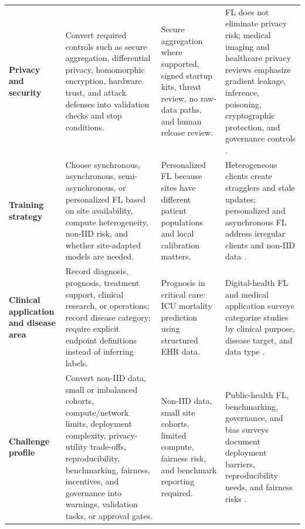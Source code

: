 \documentclass[preprint,5p, 10pt, times]{elsarticle}
\begin{document}
\begin{table}[t]
\begin{tabularx}{\textwidth}{
>{\raggedright\arraybackslash}p{2.6cm}
>{\raggedright\arraybackslash}X
>{\raggedright\arraybackslash}X
>{\raggedright\arraybackslash}X}
\textbf{Privacy and security}
& Convert required controls such as secure aggregation, differential privacy, homomorphic encryption, hardware trust, and attack defenses into validation checks and stop conditions.
& Secure aggregation where supported, signed startup kits, threat review, no raw-data paths, and human release review.
& FL does not eliminate privacy risk; medical imaging and healthcare privacy reviews emphasize gradient leakage, inference, poisoning, cryptographic protection, and governance controls \cite{kaissis2020secure,who2021ethicsaihealth,nist2023airmf}. \\

\textbf{Training strategy}
& Choose synchronous, asynchronous, semi-asynchronous, or personalized FL based on site availability, compute heterogeneity, non-IID risk, and whether site-adapted models are needed.
& Personalized FL because sites have different patient populations and local calibration matters.
& Heterogeneous clients create stragglers and stale updates; personalized and asynchronous FL address irregular clients and non-IID data \cite{li2024fedcompass,ma2023asynchronous,kairouz2021advances}. \\

\textbf{Clinical application and disease area}
& Record diagnosis, prognosis, treatment support, clinical research, or operations; record disease category; require explicit endpoint definitions instead of inferring labels.
& Prognosis in critical care: ICU mortality prediction using structured EHR data.
& Digital-health FL and medical application surveys categorize studies by clinical purpose, disease target, and data type \cite{rieke2020future,choi2024survey,teo2024federated}. \\

\textbf{Challenge profile}
& Convert non-IID data, small or imbalanced cohorts, compute/network limits, deployment complexity, privacy-utility trade-offs, reproducibility, benchmarking, fairness, incentives, and governance into warnings, validation tasks, or approval gates.
& Non-IID data, small site cohorts, limited compute, fairness risk, and benchmark reporting required.
& Public-health FL, benchmarking, governance, and bias surveys document deployment barriers, reproducibility needs, and fairness risks \cite{shah2025publichealthfl,karargyris2023medperf,eden2025scoping,benarba2025bias}. \\
\bottomrule
\end{tabularx}
\end{table}
\end{document}
